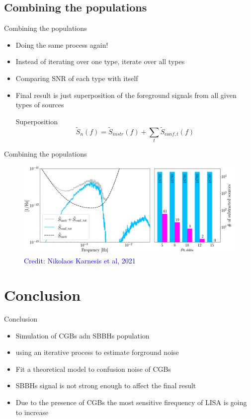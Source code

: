 \documentclass[pdf]{beamer}
\newcommand{\credit}[1]{\tiny{\textcolor{blue}{Credit: #1}}}
\begin{document}
\subsection{Combining the populations}
\begin{frame}{Combining the populations}
\begin{itemize}
\item Doing the same process again!
\item Instead of iterating over one type, iterate over all types
\item Comparing SNR of each type with itself
\item Final result is just superposition of the foreground signals from all given types of sources
\begin{block}{Superposition}
\begin{equation*}
\tilde{S}_n(f) = \tilde{S}_{instr}(f) +\sum_t \tilde{S}_{conf,t}(f)
\end{equation*}
\end{block}
\end{itemize}
\end{frame}

\begin{frame}{Combining the populations}
\begin{figure}
\includegraphics[width=.9\textwidth]{fig/combin.png}
\caption*{\credit{Nikolaos Karnesis et al, 2021}}
\end{figure}
\end{frame}


\section{Conclusion}
\begin{frame}{Conclusion}
\begin{itemize}
\item Simulation of CGBs adn SBBHs population
\item using an iterative process to estimate forground noise
\item Fit a theoretical model to confusion noise of CGBs
\item SBBHs signal is not strong enough to affect the final result
\item Due to the presence of CGBs the most sensitive firequency of LISA is going to increase
\end{itemize}
\end{frame}
\end{document}

